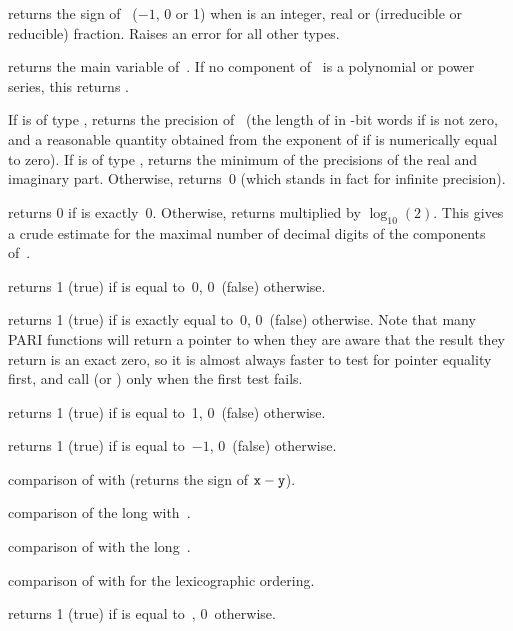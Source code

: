  returns the sign of~ ($-1$, 0 or 1) when
 is an integer, real or (irreducible or reducible) fraction. Raises an
error for all other types.

 returns the main variable of~. If no component
of~ is a polynomial or power series, this returns .

 If  is of type , returns the
precision of~ (the length of  in \B-bit words if  is not
zero, and a reasonable quantity obtained from the exponent of  if
 is numerically equal to zero). If  is of type ,
returns the minimum of the precisions of the real and imaginary part.
Otherwise, returns~0 (which stands in fact for infinite precision).

 returns 0 if  is exactly~0. Otherwise,
returns  multiplied by $\log_{10}(2)$. This gives a crude
estimate for the maximal number of decimal digits of the components
of~.


 returns 1 (true) if  is equal to~0, 0~(false)
otherwise.

 returns 1 (true) if  is exactly equal
to~0, 0~(false) otherwise. Note that many PARI functions will return a
pointer to  when they are aware that the result they return is an
exact zero, so it is almost always faster to test for pointer equality first,
and call  (or ) only when the first test fails.

 returns 1 (true) if  is equal to~1, 0~(false)
otherwise.

 returns 1 (true) if  is equal to~$-1$,
0~(false) otherwise.

 comparison of  with  (returns
the sign of ${\tt x}-{\tt y}$).

 comparison of the long 
with~.

 comparison of  with the
long~.

 comparison of  with  for the
lexicographic ordering.

 returns 1 (true) if  is equal
to~, 0~otherwise.

